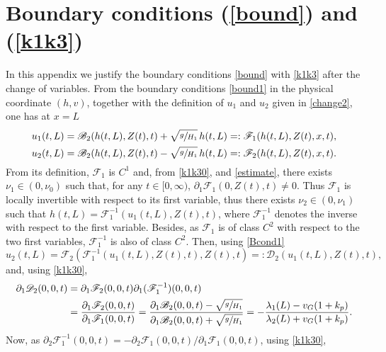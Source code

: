 \documentclass[JEP,XML,SOM,Unicode]{cedram}
\let\mathcal\mathscr
\theoremstyle{definition}
\begin{document}
\section{Boundary conditions (\ref{bound}) and (\ref{k1k3})}
\label{boundary}
In this appendix we justify the boundary conditions \eqref{bound} with \eqref{k1k3} after the change of variables. From the boundary conditions \eqref{bound1} in the physical coordinate $(h,v)$, together with the definition of $u_{1}$ and $u_{2}$
given in \eqref{change2}, one has at $x=L$
\begin{equation}
\begin{split}
u_{1}(t,L)=\mathcal{B}_{2}(h(t,L),Z(t),t)+\sqrt{\sfrac{g}{H_{1}}}\,h(t,L)=:\mathcal{F}_{1}(h(t,L),Z(t),x,t),\\
u_{2}(t,L)=\mathcal{B}_{2}(h(t,L),Z(t),t)-\sqrt{\sfrac{g}{H_{1}}}\,h(t,L)=:\mathcal{F}_{2}(h(t,L),Z(t),x,t).
\end{split}
\label{Bcond1}
\end{equation}
From its definition, $\mathcal{F}_{1}$ is $C^{1}$ and, from \eqref{k1k30}, and \eqref{estimate}, there exists $\nu_{1}\in(0,\nu_{0})$ such that, for any $t\in[0,\infty)$, $\partial_{1}{\mathcal{F}_{1}}(0,Z(t),t)\neq 0$. Thus $\mathcal{F}_{1}$ is locally invertible with respect to its first variable, thus
there exists $\nu_{2}\in(0,{\nu_{1}})$ such that
$h(t,L)=\mathcal{F}_{1}^{-1}(u_{1}(t,L),Z(t),t)$, where $\mathcal{F}_{1}^{-1}$ denotes the inverse with respect to the first variable. Besides, as $\mathcal{F}_{1}$ is of class $C^{2}$ with respect to the two first variables, $\mathcal{F}_{1}^{-1}$ is also of class $C^{2}$. Then, using \eqref{Bcond1}
\begin{equation*}
u_{2}(t,L)=\mathcal{F}_{2}(\mathcal{F}_{1}^{-1}(u_{1}(t,L),Z(t),t),Z(t),t)=:\mathcal{D}_{2}(u_{1}(t,L),Z(t),t),
\end{equation*}
and, using \eqref{k1k30},
\begin{equation*}
\begin{split}
\partial_{1}\mathcal{D}_{2}(0,0,t)&=\partial_{1}\mathcal{F}_{2}(0,0,t)\partial_{1}(\mathcal{F}_{1}^{-1})(0,0,t)\\
&=\frac{\partial_{1}\mathcal{F}_{2}(0,0,t)}{\partial_{1}\mathcal{F}_{1}(0,0,t)}=\frac{\partial_{1}\mathcal{B}_{2}(0,0,t)-\sqrt{\sfrac{g}{H_{1}}}}{\partial_{1}\mathcal{B}_{2}(0,0,t)+\sqrt{\sfrac{g}{H_{1}}}}=-\frac{\lambda_{1}(L)-v_{G}(1+k_{p})}{\lambda_{2}(L)+v_{G}(1+k_{p})}.
\end{split}
\end{equation*}
Now, as $\partial_{2}\mathcal{F}_{1}^{-1}(0,0,t)=-\partial_{2}\mathcal{F}_{1}(0,0,t)/\partial_{1}\mathcal{F}_{1}(0,0,t)$, using \eqref{k1k30},
\end{document}
